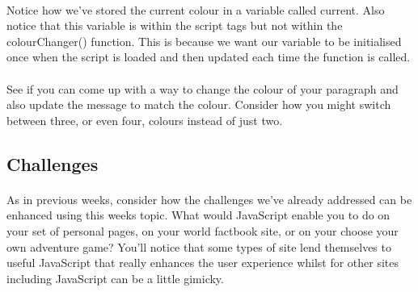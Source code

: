 \documentclass[10pt, a4paper, twosize]{article}
\begin{document}
\paragraph{} Notice how we've stored the current colour in a variable called current. Also notice that this variable is within the script tags but not within the colourChanger() function. This is because we want our variable to be initialised once when the script is loaded and then updated each time the function is called.

\paragraph{} See if you can come up with a way to change the colour of your paragraph and also update the message to match the colour. Consider how you might switch between three, or even four, colours instead of just two.

\subsection{Challenges}
\paragraph{} As in previous weeks, consider how the challenges we've already addressed can be enhanced using this weeks topic. What would JavaScript enable you to do on your set of personal pages, on your world factbook site, or on your choose your own adventure game? You'll notice that some types of site lend themselves to useful JavaScript that really enhances the user experience whilst for other sites including JavaScript can be a little gimicky.
\end{document}
